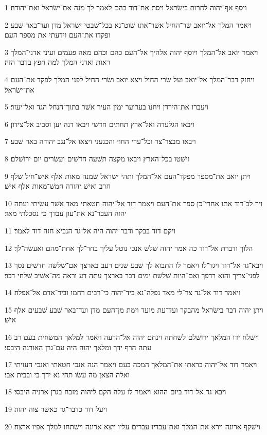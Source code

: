 \par 1 ויסף אף־יהוה לחרות בישׂראל ויסת את־דוד בהם לאמר לך מנה את־ישׂראל ואת־יהודה׃
\par 2 ויאמר המלך אל־יואב שׂר־החיל אשׁר־אתו שׁוט־נא בכל־שׁבטי ישׂראל מדן ועד־באר שׁבע ופקדו את־העם וידעתי את מספר העם׃
\par 3 ויאמר יואב אל־המלך ויוסף יהוה אלהיך אל־העם כהם וכהם מאה פעמים ועיני אדני־המלך ראות ואדני המלך למה חפץ בדבר הזה׃
\par 4 ויחזק דבר־המלך אל־יואב ועל שׂרי החיל ויצא יואב ושׂרי החיל לפני המלך לפקד את־העם את־ישׂראל׃
\par 5 ויעברו את־הירדן ויחנו בערוער ימין העיר אשׁר בתוך־הנחל הגד ואל־יעזר׃
\par 6 ויבאו הגלעדה ואל־ארץ תחתים חדשׁי ויבאו דנה יען וסביב אל־צידון׃
\par 7 ויבאו מבצר־צר וכל־ערי החוי והכנעני ויצאו אל־נגב יהודה באר שׁבע׃
\par 8 וישׁטו בכל־הארץ ויבאו מקצה תשׁעה חדשׁים ועשׂרים יום ירושׁלם׃
\par 9 ויתן יואב את־מספר מפקד־העם אל־המלך ותהי ישׂראל שׁמנה מאות אלף אישׁ־חיל שׁלף חרב ואישׁ יהודה חמשׁ־מאות אלף אישׁ׃
\par 10 ויך לב־דוד אתו אחרי־כן ספר את־העם ויאמר דוד אל־יהוה חטאתי מאד אשׁר עשׂיתי ועתה יהוה העבר־נא את־עון עבדך כי נסכלתי מאד׃
\par 11 ויקם דוד בבקר ודבר־יהוה היה אל־גד הנביא חזה דוד לאמר׃
\par 12 הלוך ודברת אל־דוד כה אמר יהוה שׁלשׁ אנכי נוטל עליך בחר־לך אחת־מהם ואעשׂה־לך׃
\par 13 ויבא־גד אל־דוד ויגד־לו ויאמר לו התבוא לך שׁבע שׁנים רעב בארצך אם־שׁלשׁה חדשׁים נסך לפני־צריך והוא רדפך ואם־היות שׁלשׁת ימים דבר בארצך עתה דע וראה מה־אשׁיב שׁלחי דבר׃
\par 14 ויאמר דוד אל־גד צר־לי מאד נפלה־נא ביד־יהוה כי־רבים רחמו וביד־אדם אל־אפלה׃
\par 15 ויתן יהוה דבר בישׂראל מהבקר ועד־עת מועד וימת מן־העם מדן ועד־באר שׁבע שׁבעים אלף אישׁ׃
\par 16 וישׁלח ידו המלאך ירושׁלם לשׁחתה וינחם יהוה אל־הרעה ויאמר למלאך המשׁחית בעם רב עתה הרף ידך ומלאך יהוה היה עם־גרן האורנה היבסי׃
\par 17 ויאמר דוד אל־יהוה בראתו את־המלאך המכה בעם ויאמר הנה אנכי חטאתי ואנכי העויתי ואלה הצאן מה עשׂו תהי נא ידך בי ובבית אבי׃
\par 18 ויבא־גד אל־דוד ביום ההוא ויאמר לו עלה הקם ליהוה מזבח בגרן ארניה היבסי׃
\par 19 ויעל דוד כדבר־גד כאשׁר צוה יהוה׃
\par 20 וישׁקף ארונה וירא את־המלך ואת־עבדיו עברים עליו ויצא ארונה וישׁתחו למלך אפיו ארצה׃
